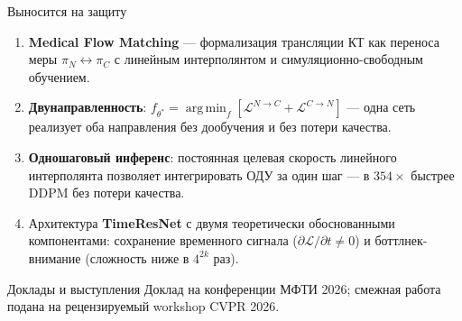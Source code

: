 \documentclass[aspectratio=43]{beamer}
\theoremstyle{definition}
\DeclareMathOperator*{\argmin}{arg\,min}
\begin{document}
\begin{frame}{Выносится на защиту}
\small

\begin{enumerate}\setlength{\itemsep}{0.35em}
  \item \textbf{Medical Flow Matching} --- формализация трансляции КТ как переноса меры $\pi_N\leftrightarrow\pi_C$ с линейным интерполянтом и симуляционно-свободным обучением.

  \item \textbf{Двунаправленность}: $f_{\theta^*}=\argmin_f[\mathcal{L}^{N\to C}+\mathcal{L}^{C\to N}]$ --- одна сеть реализует оба направления без дообучения и без потери качества.

  \item \textbf{Одношаговый инференс}: постоянная целевая скорость линейного интерполянта позволяет интегрировать ОДУ за один шаг --- в $354\times$ быстрее DDPM без потери качества.

  \item Архитектура \textbf{TimeResNet} с двумя теоретически обоснованными компонентами: сохранение временного сигнала ($\partial\mathcal{L}/\partial t\neq0$) и боттлнек-внимание (сложность ниже в $4^{2k}$ раз).
\end{enumerate}

\begin{block}{Доклады и выступления}
Доклад на конференции МФТИ 2026; смежная работа подана на рецензируемый workshop CVPR 2026.
\end{block}


\end{frame}
\end{document}
